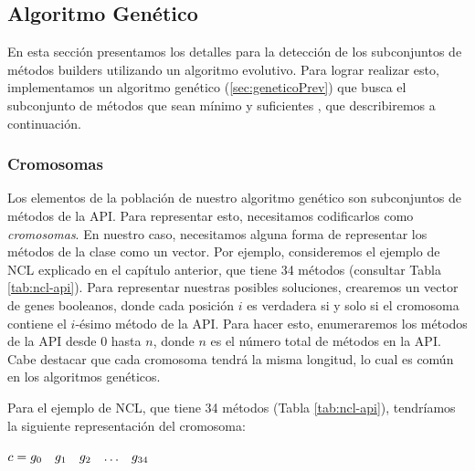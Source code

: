 \subsection{Algoritmo Genético}
\label{alg:approachGA}


En esta sección presentamos los detalles para la detección de los subconjuntos
de métodos builders utilizando un algoritmo evolutivo. Para lograr realizar
esto, implementamos un algoritmo genético (\ref{sec:geneticoPrev}) que busca el
subconjunto de métodos que sean mínimo y suficientes , que describiremos a continuación.






\subsubsection{Cromosomas}
\label{ge:cromosomas}

Los elementos de la población de nuestro algoritmo genético son subconjuntos de métodos de la API. Para representar esto, necesitamos codificarlos como \emph{cromosomas}. En nuestro caso, necesitamos alguna forma de representar los métodos de la clase como un vector. Por ejemplo, consideremos el ejemplo de NCL explicado en el capítulo anterior, que tiene 34 métodos (consultar Tabla \ref{tab:ncl-api}). Para representar nuestras posibles soluciones, crearemos un vector de genes booleanos, donde cada posición $i$ es verdadera si y solo si el cromosoma contiene el $i$-ésimo método de la API. Para hacer esto, enumeraremos los métodos de la API desde 0 hasta $n$, donde $n$ es el número total de métodos en la API. Cabe destacar que cada cromosoma tendrá la misma longitud, lo cual es común en los algoritmos genéticos.

Para el ejemplo de NCL, que tiene 34 métodos (Tabla \ref{tab:ncl-api}), tendríamos la siguiente representación del cromosoma:

\begin{center}
$c = \begin{array}{@{}cccccc@{}}
\scriptsize g_0 & \scriptsize g_1 & \scriptsize g_2 & \ldots & \scriptsize g_{34}
\end{array}$
\end{center}

